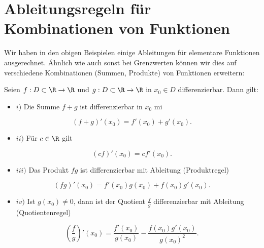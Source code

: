 \documentclass[letterpaper,10pt,english]{jupyterBook}
\begin{document}
\section{Ableitungsregeln für Kombinationen von Funktionen}
\label{\detokenize{differential/kombfkt:ableitungsregeln-fur-kombinationen-von-funktionen}}\label{\detokenize{differential/kombfkt::doc}}
Wir haben in den obigen Beispielen einige Ableitungen für elementare Funktionen ausgerechnet. Ähnlich wie auch sonst bei Grenzwerten können wir dies auf verschiedene Kombinationen (Summen, Produkte) von Funktionen erweitern:
\label{differential/kombfkt:theorem-0}
\begin{theorem}{}{}



Seien \(f: D\subset \R \rightarrow \R\) und \(g: D\subset \R \rightarrow \R\) in \(x_0 \in D\) differenzierbar. Dann gilt:
\begin{itemize}
\item {} 
\(i)\) Die Summe \(f+g\) ist differenzierbar in \(x_0\) mi

\end{itemize}
\begin{equation*}
 (f+g)'(x_0) = f'(x_0) + g'(x_0).
\end{equation*}\begin{itemize}
\item {} 
\(ii)\) Für \(c \in \R\) gilt

\end{itemize}
\begin{equation*}
 (cf)'(x_0) = c f'(x_0).
\end{equation*}\begin{itemize}
\item {} 
\(iii)\) Das Produkt \(fg\) ist differenzierbar mit Ableitung (Produktregel)

\end{itemize}
\begin{equation*}
 (fg)'(x_0) = f'(x_0) g(x_0) +  f(x_0) g'(x_0).
\end{equation*}\begin{itemize}
\item {} 
\(iv)\) Ist \(g(x_0) \neq 0\), dann ist der Quotient \(\frac{f}g\) differenzierbar mit Ableitung (Quotientenregel)

\end{itemize}
\begin{equation*}
 (\frac{f}g)'(x_0) = \frac{f'(x_0)}{ g(x_0)} -  \frac{f(x_0) g'(x_0)}{g(x_0)^2}.
\end{equation*}\end{theorem}
\end{document}
